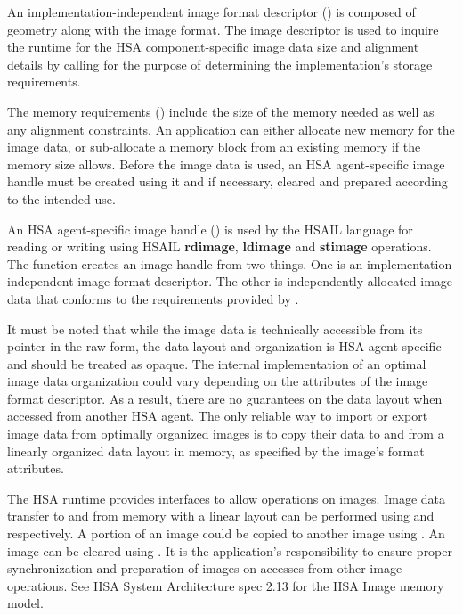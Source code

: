 \documentclass[final,oneside]{book}
\newcommand{\reffun}[1]{\textbf{#1}}
\newcommand{\refhsl}[1]{\reffun{#1}}
\begin{document}
An implementation-independent image format descriptor
() is composed of geometry along with the
image format. The image descriptor is used to inquire the runtime for the HSA
component-specific image data size and alignment details by calling
 for the purpose of determining the
implementation's storage requirements.

The memory requirements () include the size of the
memory needed as well as any alignment constraints. An application can either
allocate new memory for the image data, or sub-allocate a memory block from an
existing memory if the memory size allows. Before the image data is used, an HSA
agent-specific image handle must be created using it and if necessary, cleared
and prepared according to the intended use.

An HSA agent-specific image handle () is used by
the HSAIL language for reading or writing using HSAIL \refhsl{rdimage},
\refhsl{ldimage} and \refhsl{stimage} operations. The function
 creates an image handle from two things.
One is an implementation-independent image format descriptor. The other is
independently allocated image data that conforms to the requirements provided
by .

It must be noted that while the image data is technically accessible from its
pointer in the raw form, the data layout and organization is HSA agent-specific
and should be treated as opaque. The internal implementation of an optimal image
data organization could vary depending on the attributes of the image format
descriptor. As a result, there are no guarantees on the data layout when
accessed from another HSA agent. The only reliable way to import or export image
data from optimally organized images is to copy their data to and from a
linearly organized data layout in memory, as specified by the image's format
attributes.

The HSA runtime provides interfaces to allow operations on images. Image data
transfer to and from memory with a linear layout can be performed using
 and  respectively. A
portion of an image could be copied to another image using
. An image can be cleared using
. It is the application's responsibility to ensure
proper synchronization and preparation of images on accesses from other image
operations. See HSA System Architecture spec 2.13 for the HSA Image memory
model.
\end{document}
